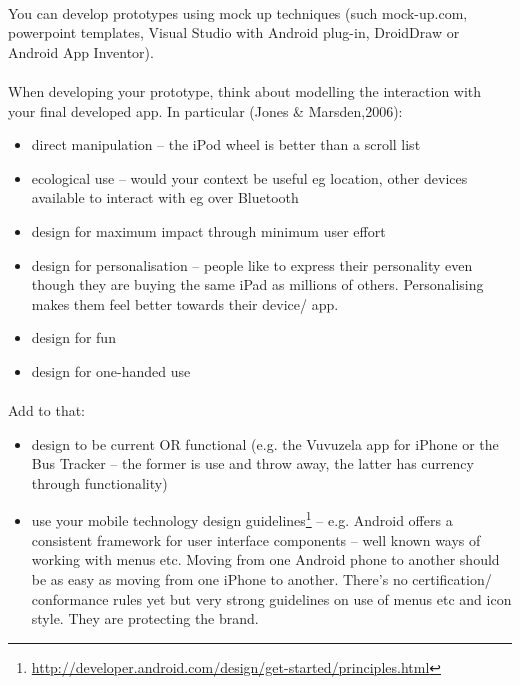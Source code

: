 \paragraph{} You can develop prototypes using mock up techniques (such mock-up.com, powerpoint templates, Visual Studio with Android plug-in, DroidDraw or Android App Inventor). 

\paragraph{} When developing your prototype, think about modelling the interaction with your final developed app. In particular (Jones \& Marsden,2006):
\begin{itemize}
\item direct manipulation – the iPod wheel is better than a scroll list
\item ecological use – would your context be useful eg location, other devices available to interact with eg over Bluetooth
\item design for maximum impact through minimum user effort
\item design for personalisation – people like to express their personality even though they are buying the same iPad as millions of others. Personalising makes them feel better towards their device/ app.
\item design for fun
\item design for one-handed use
\end{itemize}

\paragraph{} Add to that:

\begin{itemize}
\item design to be current OR functional (e.g. the Vuvuzela app for iPhone or the Bus Tracker – the former is use and throw away, the latter has currency through functionality)
\item use your mobile technology design guidelines\footnote{\url{http://developer.android.com/design/get-started/principles.html}} – e.g. Android offers a consistent framework for user interface components – well known ways of working with menus etc. Moving from one Android phone to another should be as easy as moving from one iPhone to another. There's no certification/ conformance rules yet but very strong guidelines on use of menus etc and icon style. They are protecting the brand.
\end{itemize}

